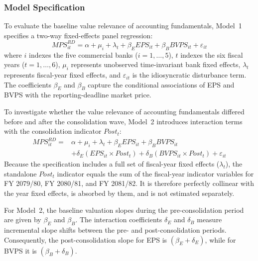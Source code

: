 \subsubsection{Model Specification}
To evaluate the baseline value relevance of accounting fundamentals, Model~1 specifies a two-way fixed-effects panel regression:
\begin{equation}
\mathit{MPS}^{RD}_{it} = \alpha + \mu_i + \lambda_t + \beta_E \mathit{EPS}_{it} + \beta_B \mathit{BVPS}_{it} + \varepsilon_{it}
\label{eq:model1}
\end{equation}
where $i$ indexes the five commercial banks ($i = 1, \dots, 5$), $t$ indexes the six fiscal years ($t = 1, \dots, 6$), $\mu_i$ represents unobserved time-invariant bank fixed effects, $\lambda_t$ represents fiscal-year fixed effects, and $\varepsilon_{it}$ is the idiosyncratic disturbance term. The coefficients $\beta_E$ and $\beta_B$ capture the conditional associations of EPS and BVPS with the reporting-deadline market price.

To investigate whether the value relevance of accounting fundamentals differed before and after the consolidation wave, Model~2 introduces interaction terms with the consolidation indicator $\mathit{Post}_t$:
\begin{equation}
\begin{aligned}
\mathit{MPS}^{RD}_{it} ={}& \alpha + \mu_i + \lambda_t + \beta_E \mathit{EPS}_{it} + \beta_B \mathit{BVPS}_{it} \\
& + \delta_E (\mathit{EPS}_{it} \times \mathit{Post}_t) + \delta_B (\mathit{BVPS}_{it} \times \mathit{Post}_t) + \varepsilon_{it}
\end{aligned}
\label{eq:model2}
\end{equation}
Because the specification includes a full set of fiscal-year fixed effects ($\lambda_t$), the standalone $\mathit{Post}_t$ indicator equals the sum of the fiscal-year indicator variables for FY 2079/80, FY 2080/81, and FY 2081/82. It is therefore perfectly collinear with the year fixed effects, is absorbed by them, and is not estimated separately.

For Model~2, the baseline valuation slopes during the pre-consolidation period are given by $\beta_E$ and $\beta_B$. The interaction coefficients $\delta_E$ and $\delta_B$ measure incremental slope shifts between the pre- and post-consolidation periods. Consequently, the post-consolidation slope for EPS is $(\beta_E + \delta_E)$, while for BVPS it is $(\beta_B + \delta_B)$.

